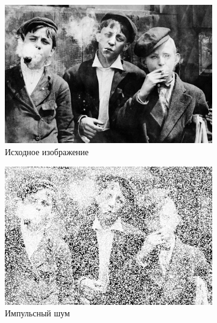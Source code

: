 \begin{figure}[ht!] 
    \centering
    \begin{subfigure}[b]{0.5\linewidth}
        \centering
        \includegraphics[width=0.95\linewidth]{../lewis-hine-taschen-main-3.jpg} 
        \caption{Исходное изображение} 
        \label{rang_3_9:a} 
        \vspace{4ex}
    \end{subfigure}%
    \begin{subfigure}[b]{0.5\linewidth}
      \centering
      \includegraphics[width=0.95\linewidth]{../Rang_Filter/Rang_Impulse_noise_(k=3,r=9).jpg} 
      \caption{Импульсный шум} 
      \label{rang_3_9:b} 
      \vspace{4ex}
    \end{subfigure}
    \begin{subfigure}[b]{0.5\linewidth}
      \centering

\end{subfigure}
\end{figure}
